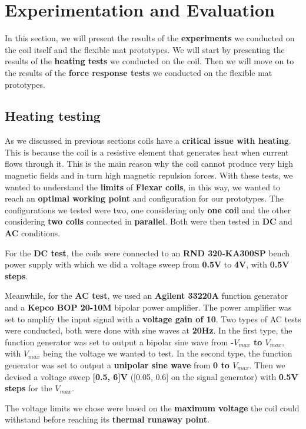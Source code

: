 \section{Experimentation and Evaluation}
In this section, we will present the results of the \textbf{experiments} we conducted on the coil itself and the flexible mat prototypes.
We will start by presenting the results of the \textbf{heating tests} we conducted on the coil.
Then we will move on to the results of the \textbf{force response tests} we conducted on the flexible mat prototypes.

\subsection{Heating testing}
As we discussed in previous sections coils have a \textbf{critical issue with heating}.
This is because the coil is a resistive element that generates heat when current flows through it.
This is the main reason why the coil cannot produce very high magnetic fields and in turn high magnetic repulsion forces.
With these tests, we wanted to understand the \textbf{limits} of \textbf{Flexar coils}, in this way, we wanted to reach an \textbf{optimal working point} and configuration for our prototypes.
The configurations we tested were two, one considering only \textbf{one coil} and the other considering \textbf{two coils} connected in \textbf{parallel}.
Both were then tested in \textbf{DC} and \textbf{AC} conditions.

For the \textbf{DC test}, the coils were connected to an \textbf{RND 320-KA300SP} bench power supply with which we did a voltage sweep from \textbf{0.5V} to \textbf{4V}, with \textbf{0.5V steps}.

Meanwhile, for the \textbf{AC test}, we used an \textbf{Agilent 33220A} function generator and a \textbf{Kepco BOP 20-10M} bipolar power amplifier.
The power amplifier was set to amplify the input signal with a \textbf{voltage gain of 10}. 
Two types of AC tests were conducted, both were done with sine waves at \textbf{20Hz}.
In the first type, the function generator was set to output a bipolar sine wave from \textbf{-$V_{max}$ to $V_{max}$}, with $V_{max}$ being the voltage we wanted to test.
In the second type, the function generator was set to output a \textbf{unipolar sine wave} from \textbf{0 to $V_{max}$}.
Then we devised a voltage sweep \textbf{[0.5, 6]V} ([0.05, 0.6] on the signal generator) with \textbf{0.5V steps} for the $V_{max}$.

The voltage limits we chose were based on the \textbf{maximum voltage} the coil could withstand before reaching its \textbf{thermal runaway point}.

